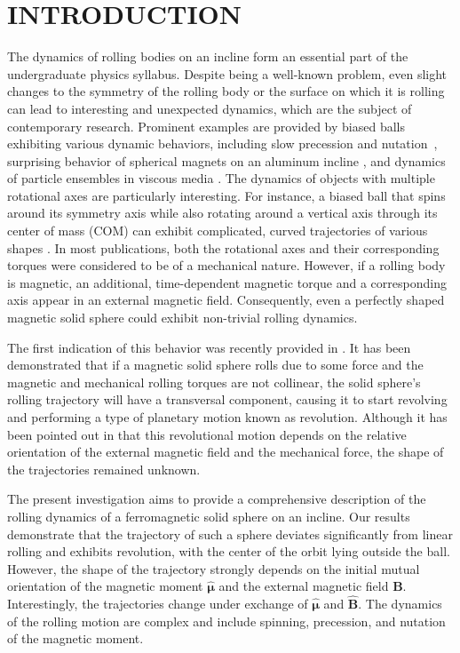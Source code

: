 \section{INTRODUCTION}

The dynamics of rolling bodies on an incline form an essential part of the undergraduate physics syllabus. Despite being a well-known problem, even slight changes to the symmetry of the rolling body or the surface on which it is rolling can lead to interesting and unexpected dynamics, which are the subject of contemporary research. Prominent examples are provided by biased balls exhibiting various dynamic behaviors, including slow precession and nutation~\cite{Wheathead:AJP2020,Kilin:RCD2017}, surprising behavior of spherical magnets on an aluminum incline \cite{Cross:PE2025}, and dynamics of particle ensembles in viscous media \cite{Wolfschwenger:AMM2024}. The dynamics of objects with multiple rotational axes are particularly interesting. For instance, a biased ball that spins around its symmetry axis while also rotating around a vertical axis through its center of mass (COM) can exhibit complicated, curved trajectories of various shapes \cite{Jalali:PRE2015}. In most publications, both the rotational axes and their corresponding torques were considered to be of a mechanical nature. However, if a rolling body is magnetic, an additional, time-dependent magnetic torque and a corresponding axis appear in an external magnetic field. Consequently, even a perfectly shaped magnetic solid sphere could exhibit non-trivial rolling dynamics.

The first indication of this behavior was recently provided in  \cite{Vedmedenko:SciRep2022}. It has been demonstrated that if a magnetic solid sphere rolls due to some force and the magnetic and mechanical rolling torques are not collinear, the solid sphere's rolling trajectory will have a transversal component, causing it to start revolving and performing a type of planetary motion known as revolution. Although it has been pointed out in \cite{Vedmedenko:SciRep2022} that this revolutional motion depends on the relative orientation of the external magnetic field and the mechanical force, the shape of the trajectories remained unknown. 

The present investigation aims to provide a comprehensive description of the rolling dynamics of a ferromagnetic solid sphere on an incline. Our results demonstrate that the trajectory of such a sphere deviates significantly from linear rolling and exhibits revolution, with the center of the orbit lying outside the ball. However, the shape of the trajectory strongly depends on the initial mutual orientation of the magnetic moment $\hat{\bm{\mu}}$ and the external magnetic field $\bm{B}$. Interestingly, the trajectories change under exchange of $\hat{\bm{\mu}}$ and $\hat{\bm{B}}$. 
The dynamics of the rolling motion are complex and include spinning, precession, and nutation of the magnetic moment.

